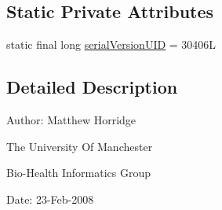 \subsection*{Static Private Attributes}
\begin{DoxyCompactItemize}
\item 
static final long \hyperlink{classuk_1_1ac_1_1manchester_1_1cs_1_1owl_1_1owlapi_1_1turtle_1_1parser_1_1_turtle_parser_exception_a0163f608bde0c3048cb7ff8ce2921a59}{serial\-Version\-U\-I\-D} = 30406\-L
\end{DoxyCompactItemize}


\subsection{Detailed Description}
Author\-: Matthew Horridge\par
 The University Of Manchester\par
 Bio-\/\-Health Informatics Group\par
 Date\-: 23-\/\-Feb-\/2008\par
\par
 

